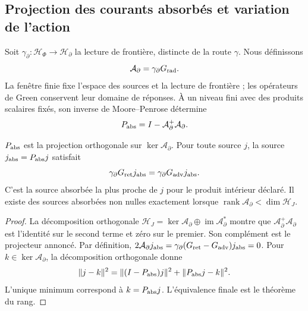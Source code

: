 \subsection{Projection des courants absorbés et variation de l'action}
\label{vii:subsec:proyeccion-absorcion}

Soit \(\gamma_\partial:\mathcal H_\Phi\to\mathcal H_\partial\)
la lecture de frontière, distincte de la route \(\gamma\). Nous définissons
\[
 \mathcal A_\partial=\gamma_\partial G_{\rm rad}.
\]
La fenêtre finie fixe l'espace des sources et la lecture de frontière ;
les opérateurs de Green conservent leur domaine de réponses. À un niveau fini avec
des produits scalaires fixés, son inverse de
Moore--Penrose détermine
\begin{equation}
 P_{\rm abs}=I-\mathcal A_\partial^+\mathcal A_\partial.
 \label{vii:eq:proyector-absorcion}
\end{equation}

\begin{theorem}
\label{vii:thm:proyeccion-absorcion}
\(P_{\rm abs}\) est la projection orthogonale sur \(\ker\mathcal A_\partial\). Pour toute source \(j\), la source \(j_{\rm abs}=P_{\rm abs}j\) satisfait
\begin{equation}
 \gamma_\partial G_{\rm ret}j_{\rm abs}
 =\gamma_\partial G_{\rm adv}j_{\rm abs}.
 \label{vii:eq:igualdad-borde-absorbido}
\end{equation}
C'est la source absorbée la plus proche de \(j\) pour le produit intérieur
déclaré. Il existe des sources absorbées non nulles exactement lorsque
\(\operatorname{rank}\mathcal A_\partial<\dim\mathcal H_J\).
\end{theorem}
\begin{proof}
La décomposition orthogonale
\(\mathcal H_J=\ker\mathcal A_\partial\oplus
 \operatorname{im}\mathcal A_\partial^*\) montre que
\(\mathcal A_\partial^+\mathcal A_\partial\) est l'identité
sur le second terme et zéro sur le premier. Son complément est le
projecteur annoncé. Par définition,
\(2\mathcal A_\partial j_{\rm abs}
 =\gamma_\partial(G_{\rm ret}-G_{\rm adv})j_{\rm abs}=0\).
Pour \(k\in\ker\mathcal A_\partial\), la décomposition orthogonale donne
\[
 \|j-k\|^2=\|(I-P_{\rm abs})j\|^2+\|P_{\rm abs}j-k\|^2.
\]
L'unique minimum correspond à \(k=P_{\rm abs}j\). L'équivalence finale est le théorème du rang.
\end{proof}


